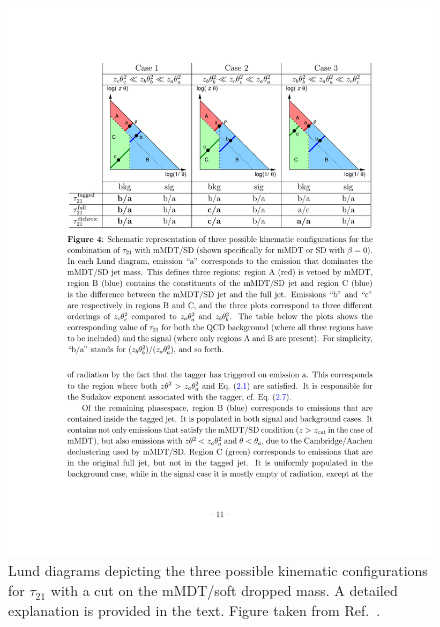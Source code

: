 \documentclass[11pt,letterpaper]{article}
\DeclareRobustCommand{\Ref}[1]{Ref.~\cite{#1}}
\begin{document}
\begin{figure}[t]
\begin{center}
\includegraphics[width=0.9\columnwidth]{figures/dichroic_placeholder}
\end{center}
\caption{Lund diagrams depicting the three possible kinematic configurations for $\tau_{21}$ with a cut on the mMDT/soft dropped mass. A detailed explanation is provided in the text. Figure taken from \Ref{Salam:2016yht}.}
\label{fig:dichroic}
\end{figure}
\end{document}
